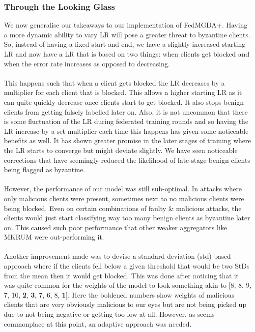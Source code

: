 \subsubsection{Through the Looking Glass}
We now generalise our takeaways to our implementation of FedMGDA+. 
Having a more dynamic ability to vary LR will pose a greater threat to byzantine clients.
So, instead of having a fixed start and end, we have a slightly increased starting LR and now have a LR that is based on two things: when clients get blocked and when the error rate increases as opposed to decreasing.
\\ \\
This happens such that when a client gets blocked the LR decreases by a multiplier for each client that is blocked.
This allows a higher starting LR as it can quite quickly decrease once clients start to get blocked.
It also stops benign clients from getting falsely labelled later on.
Also, it is not uncommon that there is some fluctuation of the LR during federated training rounds and so having the LR increase by a set multiplier each time this happens has given some noticeable benefits as well.
It has shown greater promise in the later stages of training where the LR starts to converge but might deviate slightly.
We have seen noticeable corrections that have seemingly reduced the likelihood of late-stage benign clients being flagged as byzantine.
\\ \\
However, the performance of our model was still sub-optimal.
In attacks where only malicious clients were present, sometimes next to no malicious clients were being blocked.
Even on certain combinations of faulty \& malicious attacks, the clients would just start classifying way too many benign clients as byzantine later on.
This caused such poor performance that other weaker aggregators like MKRUM were out-performing it.
\\ \\
Another improvement made was to devise a standard deviation (std)-based approach where if the clients fell below a given threshold that would be two StDs from the mean then it would get blocked.
This was done after noticing that it was quite common for the weights of the model to look something akin to [8, 8, 9, 7, 10, \textbf{2}, \textbf{3}, 7, 6, 8, \textbf{1}].
Here the boldened numbers show weights of malicious clients that are very obviously malicious to our eyes but are not being picked up due to not being negative or getting too low at all.
However, as seems commonplace at this point, an adaptive approach was needed.
